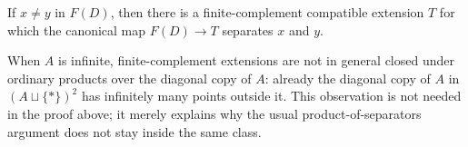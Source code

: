 \begin{corollary}[Separation]
\label{cor:finite-complement-separation}
If $x\ne y$ in $F(D)$, then there is a finite-complement compatible extension
$T$ for which the canonical map $F(D)\to T$ separates $x$ and $y$.
\end{corollary}

\begin{remark}
When $A$ is infinite, finite-complement extensions are not in general closed
under ordinary products over the diagonal copy of $A$: already the diagonal
copy of $A$ in $(A\sqcup\{\ast\})^2$ has infinitely many points outside it.
This observation is not needed in the proof above; it merely explains why the
usual product-of-separators argument does not stay inside the same class.
\end{remark}
